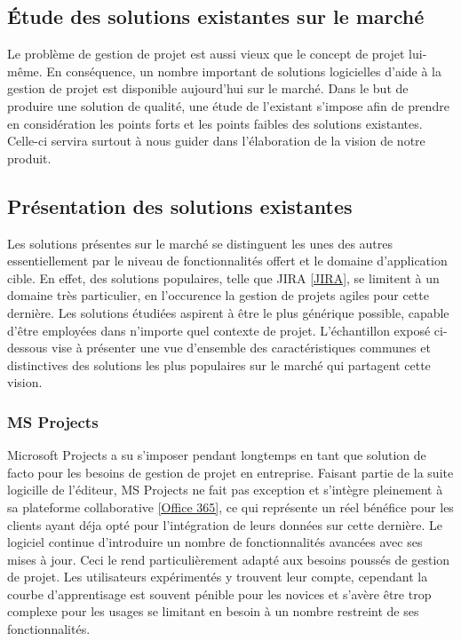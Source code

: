 \begin{spacing}{1.5}
\section{Étude des solutions existantes sur le marché}
Le problème de gestion de projet est aussi vieux que le concept de projet lui-même. En conséquence, un nombre important de solutions logicielles d'aide à la gestion de projet est disponible aujourd'hui sur le marché. Dans le but de produire une solution de qualité, une étude de l'existant s'impose afin de prendre en considération les points forts et les points faibles des solutions existantes. Celle-ci servira surtout à nous guider dans l'élaboration de la vision de notre produit.

\subsection{Présentation des solutions existantes}
Les solutions présentes sur le marché se distinguent les unes des autres essentiellement par le niveau de fonctionnalités offert et le domaine d'application cible. En effet, des solutions populaires, telle que JIRA \ref{JIRA}, se limitent à un domaine très particulier, en l'occurence la gestion de projets agiles pour cette dernière. Les solutions étudiées aspirent à être le plus générique possible, capable d'être employées dans n'importe quel contexte de projet. L'échantillon exposé ci-dessous vise à présenter une vue d'ensemble des caractéristiques communes et distinctives des solutions les plus populaires sur le marché qui partagent cette vision.

\subsubsection*{MS Projects} %
Microsoft Projects a su s'imposer pendant longtemps en tant que solution de facto pour les besoins de gestion de projet en entreprise. Faisant partie de la suite logicille de l'éditeur, MS Projects ne fait pas exception et s'intègre pleinement à sa plateforme collaborative \ref{Office 365}, ce qui représente un réel bénéfice pour les clients ayant déja opté pour l'intégration de leurs données sur cette dernière. Le logiciel continue d'introduire un nombre de fonctionnalités avancées avec ses mises à jour. Ceci le rend particulièrement adapté aux besoins poussés de gestion de projet. Les utilisateurs expérimentés y trouvent leur compte, cependant la courbe d'apprentisage est souvent pénible pour les novices et s'avère être trop complexe pour les usages se limitant en besoin à un nombre restreint de ses fonctionnalités.


\end{spacing}
